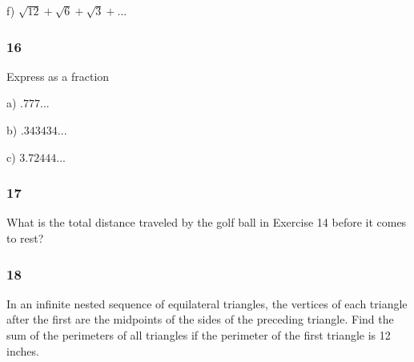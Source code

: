 \documentclass[]{report}
\begin{document}
f) $\sqrt{12} + \sqrt{6} + \sqrt{3} + ... $

\subsubsection{16}

Express as a fraction

a) $.777...$

b) $.343434...$

c) $3.72444...$

\subsubsection{17}

What is the total distance traveled by the golf ball in Exercise 14 before it comes to rest?

\subsubsection{18}

In an infinite nested sequence of equilateral triangles, the vertices of each triangle after the first are the midpoints of the sides of the preceding triangle. Find the sum of the perimeters of all triangles if the perimeter of the first triangle is 12 inches.
\end{document}
